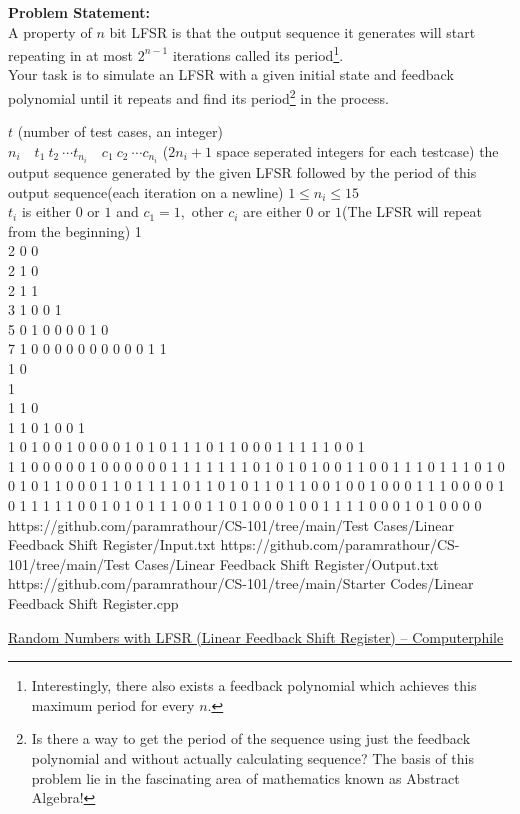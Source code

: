 \documentclass[../../Problems]{subfiles}
\begin{document}
\vspace{-2em}
\textbf{Problem Statement:}\\
A property of $n$ bit LFSR is that the output sequence it generates will start repeating in at most $2^{n-1}$ iterations called its period\footnote{Interestingly, there also exists a feedback polynomial which achieves this maximum period for every $n$.}.\\
Your task is to simulate an LFSR with a given initial state and feedback polynomial until it repeats and find its period\footnote{Is there a way to get the period of the sequence using just the feedback polynomial and without actually calculating sequence? The basis of this problem lie in the fascinating area of mathematics known as Abstract Algebra!
} in the process.
\begin{testcasesMore}
	{$t$ \hfill(number of test cases, an integer)\\
	$n_i\quad t_1\ t_2\ \cdots t_{n_i}\quad c_1\ c_2\ \cdots c_{n_i}$ \hfill($2n_i+1$ space seperated integers for each testcase)}
	{the output sequence generated by the given LFSR followed by the period of this output sequence\hfill(each iteration on a newline)}
	{$1 \leq n_i \leq 15$\\
	$t_i$ is either $0$ or $1$ and $c_1 = 1$\footnotemark,\ other $c_i$ are either $0$ or $1$\hfill(The LFSR will repeat from the beginning)}
	{1  \\2  0 0\\2  1  0\\2  1  1\\3  1 0  0 1\\5  0 1 0 0  0 0 1 0\\7  1 0 0 0 0 0  0 0 0 0 0 1}
	{1\\1 0\\1\\1 1 0\\1 1 0 1 0 0 1\\1 0 1 0 0 1 0 0 0 0 1 0 1 0 1 1 1 0 1 1 0 0 0 1 1 1 1 1 0 0 1\\1 1 0 0 0 0 0 1 0 0 0 0 0 0 1 1 1 1 1 1 1 0 1 0 1 0 1 0 0 1 1 0 0 1 1 1 0 1 1 1 0 1 0 0 1 0 1 1 0 0 0 1 1 0 1 1 1 1 0 1 1 0 1 0 1 1 0 1 1 0 0 1 0 0 1 0 0 0 1 1 1 0 0 0 0 1 0 1 1 1 1 1 0 0 1 0 1 0 1 1 1 0 0 1 1 0 1 0 0 0 1 0 0 1 1 1 1 0 0 0 1 0 1 0 0 0 0}
	{https://github.com/paramrathour/CS-101/tree/main/Test Cases/Linear Feedback Shift Register/Input.txt}
	{https://github.com/paramrathour/CS-101/tree/main/Test Cases/Linear Feedback Shift Register/Output.txt}
	{https://github.com/paramrathour/CS-101/tree/main/Starter Codes/Linear Feedback Shift Register.cpp}
\end{testcasesMore}
\begin{funvideo}
	\href{https://youtu.be/Ks1pw1X22y4}{Random Numbers with LFSR (Linear Feedback Shift Register) -- Computerphile}
\end{funvideo}
\recalctypearea
\end{document}
